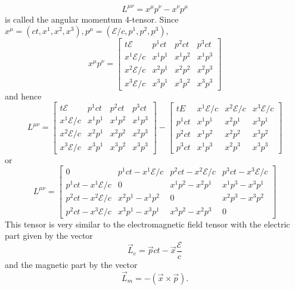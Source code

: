 \begin{enumerate}
\begin{equation}
L^{\mu\nu} = x^{\mu}p^{\nu} - x^{\nu}p^{\mu}
\end{equation}
is called the angular momentum 4-tensor. Since $x^\mu = (ct, x^1, x^2, x^3), 
p^\mu = (\mathcal{E}/c, p^1, p^2, p^3)$,
\[
x^\mu p^\nu = \begin{bmatrix}t\mathcal{E} & p^1ct & p^2ct & p^3ct \\
x^1\mathcal{E}/c & x^1p^1 & x^1p^2 & x^1p^3 \\
x^2\mathcal{E}/c & x^2p^1 & x^2p^2 & x^2p^3 \\
x^3\mathcal{E}/c & x^3p^1 & x^3p^2 & x^3p^3
\end{bmatrix}
\]
and hence
\[
L^{\mu\nu} = \begin{bmatrix}t\mathcal{E} & p^1ct & p^2ct & p^3ct \\
x^1\mathcal{E}/c & x^1p^1 & x^1p^2 & x^1p^3 \\
x^2\mathcal{E}/c & x^2p^1 & x^2p^2 & x^2p^3 \\
x^3\mathcal{E}/c & x^3p^1 & x^3p^2 & x^3p^3
\end{bmatrix} - \begin{bmatrix}tE & x^1\mathcal{E}/c & x^2\mathcal{E}/c & x^3\mathcal{E}/c \\
p^1ct & x^1p^1 & x^2p^1 & x^3p^1 \\
p^2ct & x^1p^2 & x^2p^2 & x^3p^2 \\
p^3ct & x^1p^3 & x^2p^3 & x^3p^3
\end{bmatrix}
\]
or
\begin{equation}\label{c2e87}
L^{\mu\nu} = \begin{bmatrix}0 & p^1ct - x^1\mathcal{E}/c & p^2ct - x^2\mathcal{E}/c & p^3ct - x^3\mathcal{E}/c\\
p^1ct - x^1\mathcal{E}/c & 0 & x^1p^2 - x^2p^1 & x^1p^3 - x^3p^1 \\
p^2ct - x^2\mathcal{E}/c & x^2p^1 - x^1p^2 & 0 & x^2p^3 - x^3p^2 \\
p^2ct - x^3\mathcal{E}/c & x^3p^1 - x^3p^1 & x^3p^2 - x^2p^3 & 0
\end{bmatrix}
\end{equation}
This tensor is very similar to the electromagnetic field tensor with the electric
part given by the vector
\begin{equation}\label{c2e88}
\vec{L}_e = \vec{p}ct - \vec{x}\frac{\mathcal{E}}{c}
\end{equation}
and the magnetic part by the vector
\begin{equation}\label{c2e89}
\vec{L}_m = -(\vec{x} \times \vec{p}).
\end{equation}

\end{enumerate}
